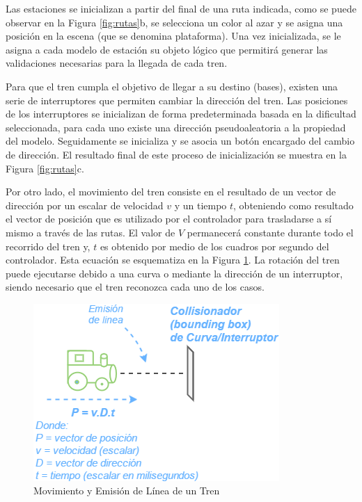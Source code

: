 \documentclass[conference]{IEEEtran}
\begin{document}
Las estaciones se inicializan a partir del final de una ruta indicada, como se puede observar en la Figura \ref{fig:rutas}b, se selecciona un color al azar y se asigna una posición en la escena (que se denomina plataforma). Una vez inicializada, se le asigna a cada modelo de estación su objeto lógico que permitirá generar las validaciones necesarias para la llegada de cada tren.


Para que el tren cumpla el objetivo de llegar a su destino (bases), existen una serie de interruptores que permiten cambiar la dirección del tren. Las posiciones de los interruptores se inicializan de forma predeterminada basada en la dificultad seleccionada, para cada uno existe una dirección pseudoaleatoria a la propiedad del modelo. Seguidamente se inicializa y se asocia un botón encargado del cambio de dirección. El resultado final de este proceso de inicialización se muestra en la Figura \ref{fig:rutas}c.


Por otro lado, el movimiento del tren consiste en el resultado de un vector de dirección por un escalar de velocidad $v$ y un tiempo $t$, obteniendo como resultado el vector de posición que es utilizado por el controlador para trasladarse a sí mismo a través de las rutas. El valor de $V$ permanecerá constante durante todo el recorrido del tren y, $t$ es obtenido por medio de los cuadros por segundo del controlador. Esta ecuación se esquematiza en la Figura \ref{fig:tren}. La rotación del tren puede ejecutarse debido a una curva o mediante la dirección de un interruptor, siendo necesario que el tren reconozca cada uno de los casos.

\begin{figure}[htpb!]
 \centering 
\includegraphics[width=0.7\columnwidth]{images/tren.png}
\caption{Movimiento y Emisión de Línea de un Tren}
\label{fig:tren}
\end{figure}
\end{document}
